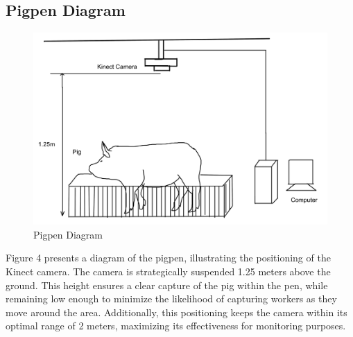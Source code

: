 {\subsection {Pigpen Diagram}

\begin{figure}[h]
	\centering
	\includegraphics[height=0.4\textheight]{figures/Untitled-1wqw}
	\caption{Pigpen Diagram}
	\label{fig:Pigpen Diagram}
\end{figure}

Figure 4 presents a diagram of the pigpen, illustrating the positioning of the Kinect camera. The camera is strategically suspended 1.25 meters above the ground. This height ensures a clear capture of the pig within the pen, while remaining low enough to minimize the likelihood of capturing workers as they move around the area. Additionally, this positioning keeps the camera within its optimal range of 2 meters, maximizing its effectiveness for monitoring purposes.

}
